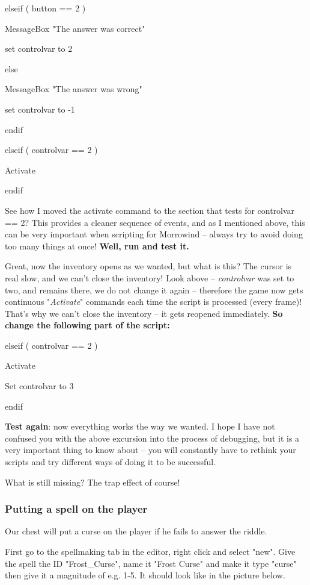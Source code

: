 \documentclass[
]{article}
\begin{document}
elseif ( button == 2 )

MessageBox "The answer was correct"

set controlvar to 2

else

MessageBox "The answer was wrong"

set controlvar to -1

endif

elseif ( controlvar == 2 )

Activate

endif

See how I moved the activate command to the section that tests for
controlvar == 2? This provides a cleaner sequence of events, and as I
mentioned above, this can be very important when scripting for Morrowind
-- always try to avoid doing too many things at once! \textbf{Well, run
and test it.}

Great, now the inventory opens as we wanted, but what is this? The
cursor is real slow, and we can't close the inventory! Look above --
\emph{controlvar} was set to two, and remains there, we do not change it
again -- therefore the game now gets continuous "\emph{Activate}"
commands each time the script is processed (every frame)! That's why we
can't close the inventory -- it gets reopened immediately. \textbf{So
change the following part of the script:}

elseif ( controlvar == 2 )

Activate

Set controlvar to 3

endif

\textbf{Test again}: now everything works the way we wanted. I hope I
have not confused you with the above excursion into the process of
debugging, but it is a very important thing to know about -- you will
constantly have to rethink your scripts and try different ways of doing
it to be successful.

What is still missing? The trap effect of course!

\hypertarget{putting-a-spell-on-the-player}{%
\subsubsection{Putting a spell on the
player}\label{putting-a-spell-on-the-player}}

Our chest will put a curse on the player if he fails to answer the
riddle.

First go to the spellmaking tab in the editor, right click and select
"new". Give the spell the ID "Frost\_Curse", name it "Frost Curse" and
make it type "curse" then give it a magnitude of e.g. 1-5. It should
look like in the picture below.
\end{document}
